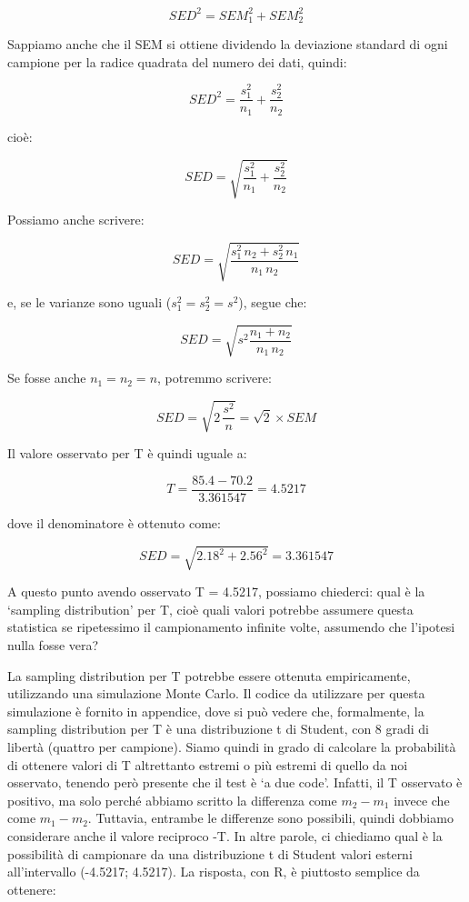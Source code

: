 \documentclass[a4paper,12pt,oneside]{book}
\theoremstyle{definition}
\theoremstyle{definition}
\theoremstyle{definition}
\theoremstyle{remark}
\begin{document}
\[SED^2 = SEM_1^2 + SEM_2^2\]

Sappiamo anche che il SEM si ottiene dividendo la deviazione standard di
ogni campione per la radice quadrata del numero dei dati, quindi:

\[SED^2 = \frac{s_1^2}{n_1} +  \frac{s_2^2}{n_2}\]

cioè:

\[SED = \sqrt{ \frac{s_1^2}{n_1} +  \frac{s_2^2}{n_2} }\]

Possiamo anche scrivere:

\[SED = \sqrt{ \frac{s_1^2 \, n_2 + s_2^2 \, n_1}{n_1 \, n_2} }\]

e, se le varianze sono uguali (\(s_1^2 = s_2^2 = s^2\)), segue che:

\[SED = \sqrt {s^2 \frac{n_1  + n_2}{n_1 \, n_2 } }\]

Se fosse anche \(n_1 = n_2 =n\), potremmo scrivere:

\[SED = \sqrt{2 \, \frac{s^2}{n} } = \sqrt{2} \times SEM\]

Il valore osservato per T è quindi uguale a:

\[T = \frac{85.4 - 70.2}{3.361547} = 4.5217\]

dove il denominatore è ottenuto come:

\[SED = \sqrt{ 2.18^2 +  2.56^2 } = 3.361547\]

A questo punto avendo osservato T = 4.5217, possiamo chiederci: qual è
la `sampling distribution' per T, cioè quali valori potrebbe assumere
questa statistica se ripetessimo il campionamento infinite volte,
assumendo che l'ipotesi nulla fosse vera?

La sampling distribution per T potrebbe essere ottenuta empiricamente,
utilizzando una simulazione Monte Carlo. Il codice da utilizzare per
questa simulazione è fornito in appendice, dove si può vedere che,
formalmente, la sampling distribution per T è una distribuzione t di
Student, con 8 gradi di libertà (quattro per campione). Siamo quindi in
grado di calcolare la probabilità di ottenere valori di T altrettanto
estremi o più estremi di quello da noi osservato, tenendo però presente
che il test è `a due code'. Infatti, il T osservato è positivo, ma solo
perché abbiamo scritto la differenza come \(m_2 - m_1\) invece che come
\(m_1 - m_2\). Tuttavia, entrambe le differenze sono possibili, quindi
dobbiamo considerare anche il valore reciproco -T. In altre parole, ci
chiediamo qual è la possibilità di campionare da una distribuzione t di
Student valori esterni all'intervallo (-4.5217; 4.5217). La risposta,
con R, è piuttosto semplice da ottenere:
\end{document}
